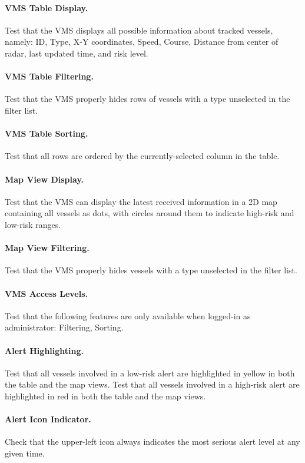 \documentclass{article}
\begin{document}
\paragraph{VMS Table Display.} Test that the VMS displays all possible information about tracked vessels, namely: ID, Type, X-Y coordinates, Speed, Course, Distance from center of radar, last updated time, and risk level.

\paragraph{VMS Table Filtering.} Test that the VMS properly hides rows of vessels with a type unselected in the filter list.

\paragraph{VMS Table Sorting.} Test that all rows are ordered by the currently-selected column in the table.

\paragraph{Map View Display.} Test that the VMS can display the latest received information in a 2D map containing all vessels as dots, with circles around them to indicate high-risk and low-risk ranges.

\paragraph{Map View Filtering.} Test that the VMS properly hides vessels with a type unselected in the filter list.

\paragraph{VMS Access Levels.} Test that the following features are only available when logged-in as administrator: Filtering, Sorting.

\paragraph{Alert Highlighting.} Test that all vessels involved in a low-risk alert are highlighted in yellow in both the table and the map views. Test that all vessels involved in a high-risk alert are highlighted in red in both the table and the map views.

\paragraph{Alert Icon Indicator.} Check that the upper-left icon always indicates the most serious alert level at any given time.
\end{document}
